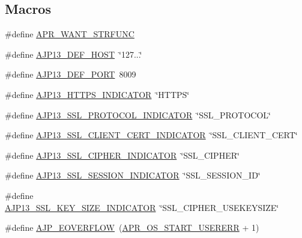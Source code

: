 \subsection*{Macros}
\begin{DoxyCompactItemize}
\item 
\#define \hyperlink{group__AJP__defines_ga88a4bf7f483aad3f3945773f3383e713}{A\+P\+R\+\_\+\+W\+A\+N\+T\+\_\+\+S\+T\+R\+F\+U\+NC}
\item 
\#define \hyperlink{group__AJP__defines_gaf85ca1ec97ada303cb5327dea915b463}{A\+J\+P13\+\_\+\+D\+E\+F\+\_\+\+H\+O\+ST}~\char`\"{}127...\char`\"{}
\item 
\#define \hyperlink{group__AJP__defines_ga8c699b0efb639a01bbd9d8e06543fa99}{A\+J\+P13\+\_\+\+D\+E\+F\+\_\+\+P\+O\+RT}~8009
\item 
\#define \hyperlink{group__AJP__defines_ga0dbc459aab5595e6672e8a9e05c4665a}{A\+J\+P13\+\_\+\+H\+T\+T\+P\+S\+\_\+\+I\+N\+D\+I\+C\+A\+T\+OR}~\char`\"{}H\+T\+T\+PS\char`\"{}
\item 
\#define \hyperlink{group__AJP__defines_ga302a76048d856e9f482f12a21ce88e9b}{A\+J\+P13\+\_\+\+S\+S\+L\+\_\+\+P\+R\+O\+T\+O\+C\+O\+L\+\_\+\+I\+N\+D\+I\+C\+A\+T\+OR}~\char`\"{}S\+S\+L\+\_\+\+P\+R\+O\+T\+O\+C\+OL\char`\"{}
\item 
\#define \hyperlink{group__AJP__defines_gab86b3e50e88a4bba2cc37664fa746219}{A\+J\+P13\+\_\+\+S\+S\+L\+\_\+\+C\+L\+I\+E\+N\+T\+\_\+\+C\+E\+R\+T\+\_\+\+I\+N\+D\+I\+C\+A\+T\+OR}~\char`\"{}S\+S\+L\+\_\+\+C\+L\+I\+E\+N\+T\+\_\+\+C\+E\+RT\char`\"{}
\item 
\#define \hyperlink{group__AJP__defines_ga4989d5a40306680f92ff37688f60ca76}{A\+J\+P13\+\_\+\+S\+S\+L\+\_\+\+C\+I\+P\+H\+E\+R\+\_\+\+I\+N\+D\+I\+C\+A\+T\+OR}~\char`\"{}S\+S\+L\+\_\+\+C\+I\+P\+H\+ER\char`\"{}
\item 
\#define \hyperlink{group__AJP__defines_ga449f661f979e5abd357f3eb5865c05bd}{A\+J\+P13\+\_\+\+S\+S\+L\+\_\+\+S\+E\+S\+S\+I\+O\+N\+\_\+\+I\+N\+D\+I\+C\+A\+T\+OR}~\char`\"{}S\+S\+L\+\_\+\+S\+E\+S\+S\+I\+O\+N\+\_\+\+ID\char`\"{}
\item 
\#define \hyperlink{group__AJP__defines_ga4d674b124341a21c24d147ba16a1b6a1}{A\+J\+P13\+\_\+\+S\+S\+L\+\_\+\+K\+E\+Y\+\_\+\+S\+I\+Z\+E\+\_\+\+I\+N\+D\+I\+C\+A\+T\+OR}~\char`\"{}S\+S\+L\+\_\+\+C\+I\+P\+H\+E\+R\+\_\+\+U\+S\+E\+K\+E\+Y\+S\+I\+ZE\char`\"{}
\item 
\#define \hyperlink{group__AJP__defines_gaabea202c79bd7a28746a204ba8344f6e}{A\+J\+P\+\_\+\+E\+O\+V\+E\+R\+F\+L\+OW}~(\hyperlink{group__apr__errno_gacd35b2de1e38a1fa4717e38d5e153571}{A\+P\+R\+\_\+\+O\+S\+\_\+\+S\+T\+A\+R\+T\+\_\+\+U\+S\+E\+R\+E\+RR} + 1)

\end{DoxyCompactItemize}

